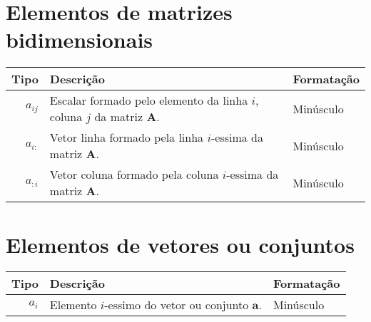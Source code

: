 \section*{Elementos de matrizes bidimensionais}
\begin{tabular}{r | p{.55\linewidth} | l}
\hline	
Tipo & Descrição & Formatação \\ \hline
$a_{ij}$ & Escalar formado pelo elemento da linha $i$, coluna $j$ da matriz $\mathbf{A}$. & Minúsculo \\ \hline
$a_{i:}$ & Vetor linha formado pela linha $i$-essima da matriz $\mathbf{A}$.  & Minúsculo \\
$a_{:i}$ & Vetor coluna formado pela coluna $i$-essima da matriz $\mathbf{A}$.  & Minúsculo \\
\end{tabular}

\section*{Elementos de vetores ou conjuntos}
\begin{tabular}{r | p{.55\linewidth} | l}
\hline	
Tipo & Descrição & Formatação \\ \hline
$a_{i}$ & Elemento $i$-essimo do vetor ou conjunto  $\mathbf{a}$.& Minúsculo \\
\end{tabular}

